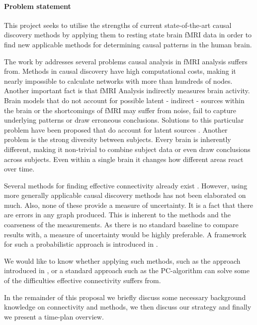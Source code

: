 \documentclass[a4paper, 10pt, english, twocolumn]{article}
\begin{document}
\paragraph{Problem statement}
This project seeks to utilise the strengths of current state-of-the-art causal discovery methods by applying them to resting state brain fMRI data in order to find new applicable methods for determining causal patterns in the human brain.

The work by \cite{ramsey2010} addresses several problems causal analysis in fMRI analysis suffers from.
Methods in causal discovery have high computational costs, making it nearly impossible to calculate networks with more than hundreds of nodes.
Another important fact is that fMRI Analysis indirectly measures brain activity.
Brain models that do not account for possible latent - indirect - sources within the brain or the shortcomings of fMRI may suffer from noise, fail to capture underlying patterns or draw erroneous conclusions.
Solutions to this particular problem have been proposed that do account for latent sources \cite{ramsey2010, waldorp2011}.
Another problem is the strong diversity between subjects.
Every brain is inherently different, making it non-trivial to combine subject data or even draw conclusions across subjects.
Even within a single brain it changes how different areas react over time.

Several methods for finding effective connectivity already exist \cite{mclntosh1994, harrison2003, friston2003, roebroeck2005}.
However, using more generally applicable causal discovery methods has not been elaborated on much.
Also, none of these provide a measure of uncertainty.
It is a fact that there are errors in any graph produced.
This is inherent to the methods and the coarseness of the measurements.
As there is no standard baseline to compare results with, a measure of uncertainty would be highly preferable.
A framework for such a probabilistic approach is introduced in \cite{claassen2012}.

We would like to know whether applying such methods, such as the approach introduced in \cite{claassen2012}, or a standard approach such as the PC-algorithm \cite{spirtes2000} can solve some of the difficulties effective connectivity suffers from.

In the remainder of this proposal we briefly discuss some necessary background knowledge on connectivity and methods, we then discuss our strategy and finally we present a time-plan overview.
\end{document}
